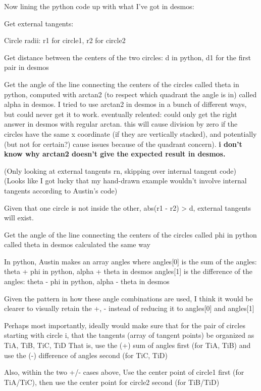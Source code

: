 \documentclass[sigconf]{acmart}
\begin{document}
Now lining the python code up with what I've got in desmos:

Get external tangents:

    Circle radii:
    r1 for circle1, r2 for circle2
    
    Get distance between the centers of the two circles:
    d in python, d1 for the first pair in desmos

    Get the angle of the line connecting the centers of the circles
    called theta in python, computed with arctan2 (to respect which quadrant the angle is in)
    called alpha in desmos. I tried to use arctan2 in desmos in a bunch of different ways, but could never get it to work. eventually relented: could only get the right answer in desmos with regular arctan. this will cause division by zero if the circles have the same x coordinate (if they are vertically stacked), and potentially (but not for certain?) cause issues because of the quadrant concern). \textbf{i don't know why arctan2 doesn't give the expected result in desmos.}

    (Only looking at external tangents rn, skipping over internal tangent code)
    (Looks like I got lucky that my hand-drawn example wouldn't involve internal tangents according to Austin's code)

    Given that one circle is not inside the other, abs(r1 - r2) > d, external tangents will exist.
    
    Get the angle of the line connecting the centers of the circles
    called phi in python
    called theta in desmos
    calculated the same way

    In python, Austin makes an array angles where
    angles[0] is the sum of the angles: theta + phi in python, alpha + theta in desmos
    angles[1] is the difference of the angles: theta - phi in python, alpha - theta in desmos

    Given the pattern in how these angle combinations are used, I think it would be clearer to visually retain the +, - instead of reducing it to angles[0] and angles[1]

    Perhaps most importantly, ideally would make sure that for the pair of circles starting with circle i, that the tangents (array of tangent points) be organized as TiA, TiB, TiC, TiD
    That is, use the (+) sum of angles first (for TiA, TiB)
    and use the (-) difference of angles second (for TiC, TiD)

    Also, within the two +/- cases above,
    Use the center point of circle1 first (for TiA/TiC), then use the center point for circle2 second (for TiB/TiD)
\end{document}
